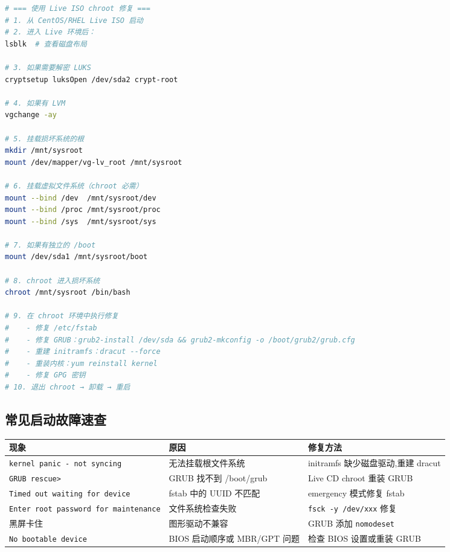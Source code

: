 \documentclass[12pt,UTF8]{ctexbook}
\begin{document}
\begin{lstlisting}[language=bash]
# === 使用 Live ISO chroot 修复 ===
# 1. 从 CentOS/RHEL Live ISO 启动
# 2. 进入 Live 环境后：
lsblk  # 查看磁盘布局

# 3. 如果需要解密 LUKS
cryptsetup luksOpen /dev/sda2 crypt-root

# 4. 如果有 LVM
vgchange -ay

# 5. 挂载损坏系统的根
mkdir /mnt/sysroot
mount /dev/mapper/vg-lv_root /mnt/sysroot

# 6. 挂载虚拟文件系统（chroot 必需）
mount --bind /dev  /mnt/sysroot/dev
mount --bind /proc /mnt/sysroot/proc
mount --bind /sys  /mnt/sysroot/sys

# 7. 如果有独立的 /boot
mount /dev/sda1 /mnt/sysroot/boot

# 8. chroot 进入损坏系统
chroot /mnt/sysroot /bin/bash

# 9. 在 chroot 环境中执行修复
#    - 修复 /etc/fstab
#    - 修复 GRUB：grub2-install /dev/sda && grub2-mkconfig -o /boot/grub2/grub.cfg
#    - 重建 initramfs：dracut --force
#    - 重装内核：yum reinstall kernel
#    - 修复 GPG 密钥
# 10. 退出 chroot → 卸载 → 重启
\end{lstlisting}

\subsection{常见启动故障速查}

\begin{tabular}{|p{3cm}|p{3cm}|p{5cm}|}
\hline
\textbf{现象} & \textbf{原因} & \textbf{修复方法} \\
\hline
\texttt{kernel panic - not syncing} & 无法挂载根文件系统 & initramfs 缺少磁盘驱动,重建 dracut \\
\hline
\texttt{GRUB rescue>} & GRUB 找不到 /boot/grub & Live CD chroot 重装 GRUB \\
\hline
\texttt{Timed out waiting for device} & fstab 中的 UUID 不匹配 & emergency 模式修复 fstab \\
\hline
\texttt{Enter root password for maintenance} & 文件系统检查失败 & \texttt{fsck -y /dev/xxx} 修复 \\
\hline
黑屏卡住 & 图形驱动不兼容 & GRUB 添加 \texttt{nomodeset} \\
\hline
\texttt{No bootable device} & BIOS 启动顺序或 MBR/GPT 问题 & 检查 BIOS 设置或重装 GRUB \\
\hline
\end{tabular}
\end{document}
